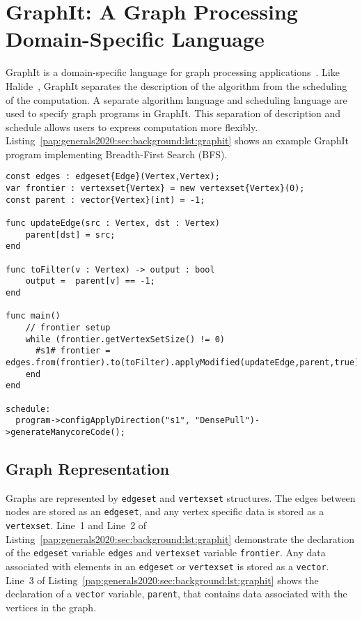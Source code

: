 
\section{GraphIt: A Graph Processing Domain-Specific Language}\label{pap:generals2020:sec:graphit}

GraphIt is a domain-specific language for graph processing applications~\citep{zhang2018graphit}.
Like Halide~\citep{ragan2013halide}, GraphIt separates the description of the algorithm from the scheduling of the computation. A separate algorithm language and scheduling language are used to specify graph programs in GraphIt. This separation of description and schedule allows users to express computation more flexibly.
Listing~\ref{pap:generals2020:sec:background:lst:graphit} shows an example GraphIt program implementing Breadth-First Search (BFS).

\begin{lstlisting}[language=graphit, 
                   caption=GraphIt code for Breadth-First Search (BFS),
                   label=pap:generals2020:sec:background:lst:graphit]
const edges : edgeset{Edge}(Vertex,Vertex);
var frontier : vertexset{Vertex} = new vertexset{Vertex}(0);
const parent : vector{Vertex}(int) = -1;

func updateEdge(src : Vertex, dst : Vertex)
    parent[dst] = src;
end

func toFilter(v : Vertex) -> output : bool
    output =  parent[v] == -1;
end

func main()
    // frontier setup
    while (frontier.getVertexSetSize() != 0)
      #s1# frontier = edges.from(frontier).to(toFilter).applyModified(updateEdge,parent,true);
    end
end

schedule:
  program->configApplyDirection("s1", "DensePull")->generateManycoreCode();
\end{lstlisting}

\subsection{Graph Representation}
Graphs are represented by \lstinline[language=graphit]{edgeset} and \lstinline[language=graphit]{vertexset} structures.
The edges between nodes are stored as an \lstinline[language=graphit]{edgeset}, and any vertex specific data is stored as a \lstinline[language=graphit]{vertexset}.
Line~1 and Line~2 of Listing~\ref{pap:generals2020:sec:background:lst:graphit} demonstrate the declaration of the \lstinline[language=graphit]{edgeset} variable \lstinline[language=graphit]{edges} and  \lstinline[language=graphit]{vertexset} variable \lstinline[language=graphit]{frontier}. 
Any data associated with elements in an \lstinline[language=graphit]{edgeset} or \lstinline[language=graphit]{vertexset} is stored as a \lstinline[language=graphit]{vector}.
Line~3 of Listing~\ref{pap:generals2020:sec:background:lst:graphit} shows the declaration of a \lstinline[language=graphit]{vector} variable, \lstinline[language=graphit]{parent}, that contains data associated with the vertices in the graph.

